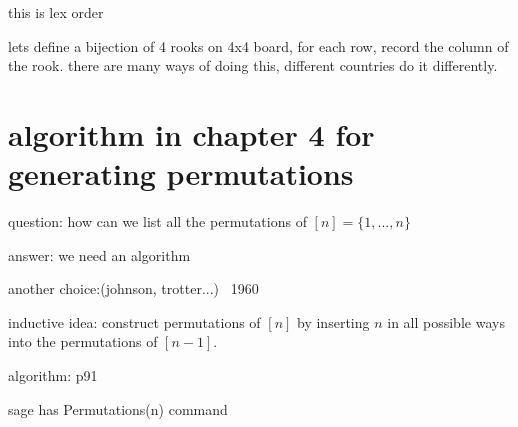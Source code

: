 \documentclass{article}
\begin{document}
this is lex order

lets define a bijection of 4 rooks on 4x4 board, for each row, record the column of the rook. there are many ways of doing this, different countries do it differently.

\section*{algorithm in chapter 4 for generating permutations}
question: how can we list all the permutations of $[n]=\{1,...,n\}$ 

answer: we need an algorithm

another choice:(johnson, trotter...) ~1960

inductive idea: construct permutations of $[n]$ by inserting $n$ in all possible ways into the permutations of $[n-1]$.

algorithm: p91

sage has Permutations(n) command
\end{document}
